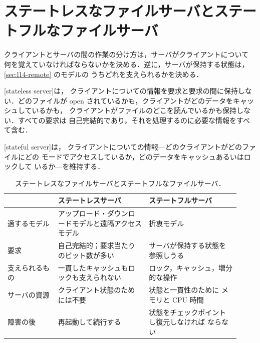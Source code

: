 \documentclass[../main.tex]{subfiles}
\begin{document}
\section{ステートレスなファイルサーバとステートフルなファイルサーバ}
\label{sec:l14-state}

クライアントとサーバの間の作業の分け方は，サーバがクライアントについて
何を覚えていなければならないかを決める．逆に，サーバが保持する状態は，\cref{sec:l14-remote} のモデルの
うちどれを支えられるかを決める．

\begin{definition}[ステートレスサーバ]
  [stateless server]は，
  クライアントについての情報を要求と要求の間に保持しない．どのファイルが
  open されているかも，クライアントがどのデータをキャッシュしているかも，
  クライアントがファイルのどこを読んでいるかも保持しない．すべての要求は
  自己完結的であり，それを処理するのに必要な情報をすべて含む．
\end{definition}

\begin{definition}[ステートフルサーバ]
  [stateful server]は，
  クライアントについての情報---どのクライアントがどのファイルにどの
  モードでアクセスしているか，どのデータをキャッシュあるいはロックして
  いるか---を維持する．
\end{definition}

\begin{table}[htbp]
  \centering
  \caption{ステートレスなファイルサーバとステートフルなファイルサーバ．}
  \label{tab:l14-state}
  \small
  \begin{tabular}{@{}>{\raggedright\arraybackslash}p{0.2\linewidth}>{\raggedright\arraybackslash}p{0.36\linewidth}>{\raggedright\arraybackslash}p{0.36\linewidth}@{}}
    \toprule
    & ステートレスサーバ & ステートフルサーバ \\
    \midrule
    適するモデル & アップロード・ダウンロードモデルと遠隔アクセスモデル &
      折衷モデル \\
    要求 & 自己完結的；要求当たりのビット数が多い & サーバが保持する状態を
      参照しうる \\
    支えられるもの & 一貫したキャッシュもロックも支えられない &
      ロック，キャッシュ，増分的な操作 \\
    サーバの資源 & クライアント状態のためには不要 & 状態と一貫性のために
      メモリと CPU 時間 \\
    障害の後 & 再起動して続行する & 状態をチェックポイントし復元しなければ
      ならない \\
    \bottomrule
  \end{tabular}
\end{table}
\end{document}
